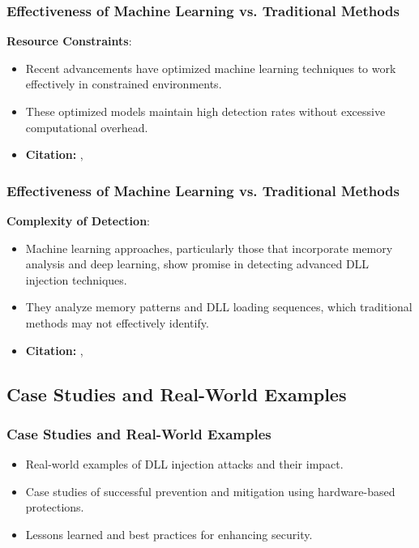 \begin{frame}
    \frametitle{Effectiveness of Machine Learning vs. Traditional Methods}
    \textbf{Resource Constraints}:
    \begin{itemize}
        \item Recent advancements have optimized machine learning techniques to work effectively in constrained environments.
        \item These optimized models maintain high detection rates without excessive computational overhead.
        \item \textbf{Citation:} \cite{kim2023}, \cite{stackoverflow2012}
    \end{itemize}
\end{frame}

\begin{frame}
    \frametitle{Effectiveness of Machine Learning vs. Traditional Methods}
    \textbf{Complexity of Detection}:
    \begin{itemize}
        \item Machine learning approaches, particularly those that incorporate memory analysis and deep learning, show promise in detecting advanced DLL injection techniques.
        \item They analyze memory patterns and DLL loading sequences, which traditional methods may not effectively identify.
        \item \textbf{Citation:} \cite{sihwail2021}, \cite{stackoverflow2012}
    \end{itemize}
\end{frame}

\subsection{Case Studies and Real-World Examples}
\begin{frame}
    \frametitle{Case Studies and Real-World Examples}
    \begin{itemize}
        \item Real-world examples of DLL injection attacks and their impact.
        \item Case studies of successful prevention and mitigation using hardware-based protections.
        \item Lessons learned and best practices for enhancing security.
    \end{itemize}
\end{frame}
